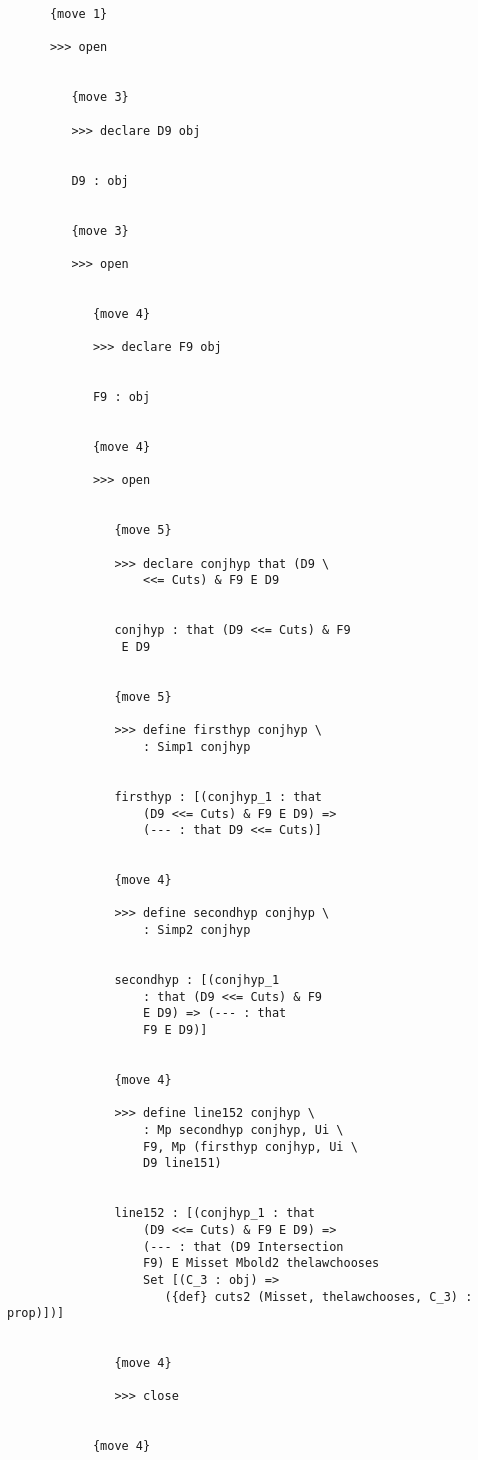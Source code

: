\documentclass[12pt]{article}
\begin{document}
\begin{verbatim}
      {move 1}

      >>> open


         {move 3}

         >>> declare D9 obj


         D9 : obj


         {move 3}

         >>> open


            {move 4}

            >>> declare F9 obj


            F9 : obj


            {move 4}

            >>> open


               {move 5}

               >>> declare conjhyp that (D9 \
                   <<= Cuts) & F9 E D9


               conjhyp : that (D9 <<= Cuts) & F9 
                E D9


               {move 5}

               >>> define firsthyp conjhyp \
                   : Simp1 conjhyp


               firsthyp : [(conjhyp_1 : that 
                   (D9 <<= Cuts) & F9 E D9) => 
                   (--- : that D9 <<= Cuts)]


               {move 4}

               >>> define secondhyp conjhyp \
                   : Simp2 conjhyp


               secondhyp : [(conjhyp_1 
                   : that (D9 <<= Cuts) & F9 
                   E D9) => (--- : that 
                   F9 E D9)]


               {move 4}

               >>> define line152 conjhyp \
                   : Mp secondhyp conjhyp, Ui \
                   F9, Mp (firsthyp conjhyp, Ui \
                   D9 line151)


               line152 : [(conjhyp_1 : that 
                   (D9 <<= Cuts) & F9 E D9) => 
                   (--- : that (D9 Intersection 
                   F9) E Misset Mbold2 thelawchooses 
                   Set [(C_3 : obj) => 
                      ({def} cuts2 (Misset, thelawchooses, C_3) : prop)])]


               {move 4}

               >>> close


            {move 4}


\end{verbatim}
\end{document}
